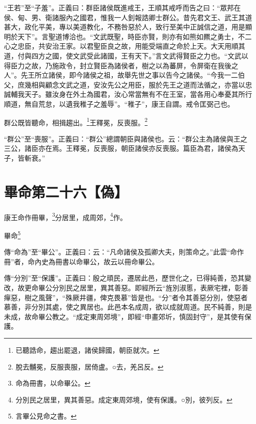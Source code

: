 {\noindent\shu{}\fzkt “王若”至“子羞”。正義曰：群臣諸侯既進戒王，王順其戒呼而告之曰：“眾邦在侯、甸、男、衛諸服內之國君，惟我一人釗報誥卿士群公。昔先君文王、武王其道甚大，政化平美，專以美道教化，不務咎惡於人，致行至美中正誠信之道，用是顯明於天下”。言聖道博洽也。“文武既聖，時臣亦賢，則亦有如熊如羆之勇士，不二心之忠臣，共安治王家。以君聖臣良之故，用能受端直之命於上天。大天用順其道，付與四方之國，使文武受此諸國，王有天下。”言文武得賢臣之力也。“文武以得臣力之故，乃施政令，封立賢臣為諸侯者，樹之以為蕃屏，令屏衛在我後之人”。先王所立諸侯，即今諸侯之祖，故舉先世之事以告今之諸侯。“今我一二伯父，庶幾相與顧念文武之道，安汝先公之用臣，服於先王之道而法循之，亦當以忠誠輔我天子。雖汝身在外土為國君，汝心常當無有不在王室，當各用心奉憂其所行順道，無自荒怠，以遺我稚子之羞辱”。“稚子”，康王自謂。戒令匡弼己也。 \par}

群公既皆聽命，相揖趨出。\footnote{已聽誥命，趨出罷退，諸侯歸國，朝臣就次。}王釋冕，反喪服。\footnote{脫去黼冕，反服喪服，居倚盧。○去，羌呂反。}

{\noindent\shu{}\fzkt “群公”至“喪服”。正義曰：“群公”總謂朝臣與諸侯也。云：“群公主為諸侯與王之三公，諸臣亦在焉。王釋冕，反喪服，朝臣諸侯亦反喪服。篇臣為君，諸侯為天子，皆斬衰。” \par}

\section{畢命第二十六【偽】}


康王命作冊畢，\footnote{命為冊書，以命畢公。}分居里，成周郊，\footnote{分別民之居里，異其善惡。成定東周郊境，使有保護。○別，彼列反。}作。

畢命\footnote{言畢公見命之書。}


{\noindent\zhuan{}\fzbyks 傳“命為”至“畢公”。正義曰：云：“凡命諸侯及孤卿大夫，則策命之。”此雲“命作冊”者，命內史為冊書以命畢公，故云以冊命畢公。 \par}

{\noindent\zhuan{}\fzbyks 傳“分別”至“保護”。正義曰：殷之頑民，遷居此邑，歷世化之，已得純善，恐其變改，故更命畢公分別民之居里，異其善惡。即經所云“旌別淑慝，表厥宅裡，彰善癉惡，樹之風聲”，“殊厥井疆，俾克畏慕”皆是也。“分”者令其善惡分別，使惡者慕善，非分別其處，使之異居也。此邑本名成周，欲以成就周道。民不純善，則是未成，故命畢公教之。“成定東周郊境”，即經“申畫郊圻，慎固封守”，是其使有保護。 \par}

